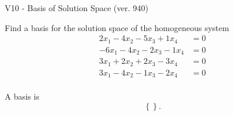 \begin{exercise}
  \begin{exerciseTitle}V10 - Basis of Solution Space (ver. 940)\end{exerciseTitle}
  \begin{exerciseStatement}
    Find a basis for the solution space of the homogeneous system 
\begin{align*}
 2 x_ 1 -4 x_ 2 -5 x_ 3 + 1 x_ 4 &= 0  \\ 
  -6 x_ 1 -4 x_ 2 -2 x_ 3 -1 x_ 4 &= 0  \\ 
  3 x_ 1 + 2 x_ 2 + 2 x_ 3 -3 x_ 4 &= 0  \\ 
  3 x_ 1 -4 x_ 2 -1 x_ 3 -2 x_ 4 &= 0  \\ 
 \end{align*}


 
  \end{exerciseStatement}

  \begin{exerciseAnswer}
   A basis is   
\[\left\{\right\}.\]

  


  \end{exerciseAnswer}
\end{exercise}